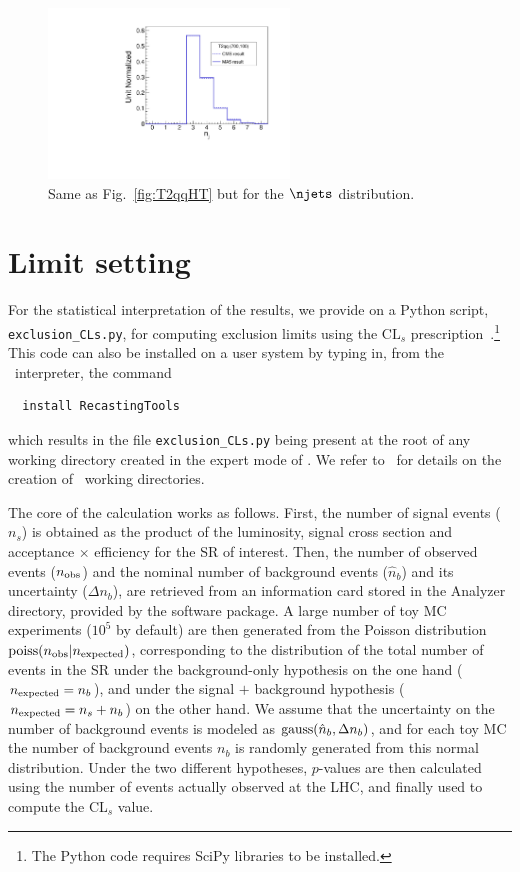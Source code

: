 \begin{figure}
\centering
\includegraphics[width=6.4cm]{figures/madanalysis5/cms-012-T2qqNJets.pdf}
\caption{Same as Fig.~\ref{fig:T2qqHT} but for the $\njets$ distribution.}
\label{fig:T2qqNJets}
\end{figure}


\section{Limit setting}\label{sec:CLprocedure}



For the statistical interpretation of the results, we provide on \cite{ma5wiki} a {\sc Python} script, 
{\tt exclusion\_CLs.py}, for computing exclusion limits using the $\mathrm{CL}_s$ prescription~\cite{bib-cls}.\footnote{The
{\sc Python} code requires {\sc SciPy} libraries to be installed.}
This code can also be installed on a user system by typing in, from the \ma\ interpreter, the command
\begin{verbatim}
  install RecastingTools
\end{verbatim}
which results in the file \texttt{exclusion\_CLs.py} being present at the
root of any working directory created in the expert mode of \ma. 
We refer to~\cite{Conte:2014zja,ma5wiki} for details on the creation of \ma\ working directories.


The core of the calculation works as follows. First, the number of signal events ($n_s$) is obtained as the
product of the luminosity, signal cross section and acceptance $\times$ efficiency for the SR of interest.
Then, the number of observed events ($n_{\rm obs}$) and the nominal number of background
events ($\hat n_b$) and its uncertainty ($\Delta n_b$), are retrieved from an information card stored in the Analyzer directory, provided by the software package.
A large number of toy MC experiments ($10^5$ by default) are then generated from the Poisson distribution
${\rm poiss}(n_{\rm obs} | n_{\rm expected})$, 
corresponding to the distribution of the total number of events in the SR under the
background-only hypothesis on the one hand ($n_{\rm expected} = n_b$), and under the
signal $+$ background hypothesis ($n_{\rm expected} = n_s + n_b$) on the other hand.
We assume that the uncertainty on the number of background events is modeled as ${\rm gauss}(\hat n_b, \Delta n_b)$,
and for each toy MC the number of background events $n_b$ is randomly generated from this normal distribution.
Under the two different hypotheses, $p$-values are then calculated using the number of events actually observed at the LHC, and finally used to compute the CL$_s$ value.

